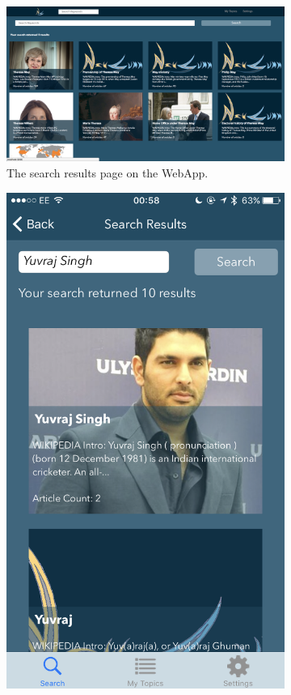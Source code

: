 \documentclass[12pt]{article}
\begin{document}
\begin{appendices}
\begin{figure}[ht!]
  \centering
  \begin{subfigure}[t]{0.6\textwidth}
        \includegraphics[width=\textwidth]{desktopsearch.PNG}
        \caption{The search results page on the WebApp.}
    \end{subfigure}
   \qquad
    \begin{subfigure}[t]{0.3\textwidth}
    \includegraphics[width=\textwidth]{phonesearch.PNG}

\end{subfigure}
\end{figure}
\end{appendices}
\end{document}
